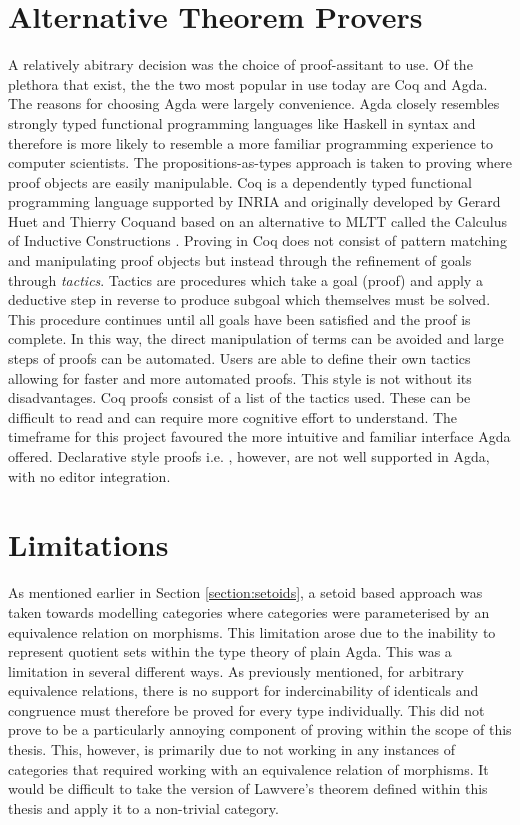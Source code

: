 
\section{Alternative Theorem Provers}
\label{sec:altthmprov}
A relatively abitrary decision was the choice of proof-assitant to use. Of the
plethora that exist, the the two most popular in use today are Coq
\cite{coq}
and Agda. The reasons for choosing Agda were largely convenience. Agda
closely resembles strongly typed functional programming languages like Haskell
in syntax and therefore is more likely to resemble a more familiar programming
experience to computer scientists. The propositions-as-types approach is taken
to proving where proof objects are easily manipulable. Coq is a dependently
typed functional programming language supported by INRIA and originally
developed by Gerard Huet and Thierry Coquand based on an alternative to MLTT
called the Calculus of Inductive Constructions \cite{pfenning1989inductively}. Proving in Coq does not consist
of pattern matching and manipulating proof objects but instead through the
refinement of goals through \textit{tactics}. Tactics are procedures which take
a goal (proof) and apply a deductive step in reverse to produce subgoal which
themselves must be solved. This procedure continues until all goals have been
satisfied and the proof is complete. In this way, the direct manipulation of
terms can be avoided and large steps of proofs can be automated. Users are able
to define their own tactics allowing for faster and more automated proofs. This
style is not without its disadvantages. Coq proofs consist of a list of
the tactics used. These can be difficult to read and can require more cognitive
effort to understand. The timeframe for this project favoured the more intuitive
and familiar interface Agda offered. Declarative style proofs i.e.
, however, are not well supported in Agda, with no editor
integration.

\section{Limitations}
As mentioned earlier in Section \ref{section:setoids}, a setoid based approach
was taken towards modelling categories where categories were parameterised by an
equivalence relation on morphisms. This limitation arose due to the inability to
represent quotient sets within the type theory of plain Agda. This was a
limitation in several different ways. As previously mentioned, for arbitrary
equivalence relations, there is no support for indercinability of identicals and
congruence must therefore be proved for every type individually. This did not
prove to be a particularly annoying component of proving within the scope of
this thesis.  This, however, is primarily due to not working in any instances of
categories that required working with an equivalence relation of morphisms. It
would be difficult to take the version of Lawvere's theorem defined within this
thesis and apply it to a non-trivial category.

